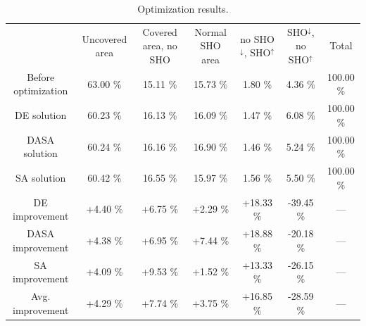 \begin{table}
\centering

\caption{Optimization results.\textit{\label{tab:optimization-results}}}


\begin{tabular}{ccccccc}
\toprule 
 & Uncovered area & Covered area, no SHO & Normal SHO area & no SHO$^{\downarrow}$, SHO$^{\uparrow}$ & SHO$^{\downarrow}$, no SHO$^{\uparrow}$ & Total\tabularnewline\addlinespace
\midrule
Before optimization & 63.00 \% & 15.11 \% & 15.73 \% & 1.80 \% & 4.36 \% & 100.00 \%\tabularnewline
\cmidrule{2-7} 
DE solution & 60.23 \% & 16.13 \% & 16.09 \% & 1.47 \% & 6.08 \% & 100.00 \%\tabularnewline
DASA solution & 60.24 \% & 16.16 \% & 16.90 \% & 1.46 \% & 5.24 \% & 100.00 \%\tabularnewline
SA solution & 60.42 \% & 16.55 \% & 15.97 \% & 1.56 \% & 5.50 \% & 100.00 \%\tabularnewline
\cmidrule{2-7} 
DE improvement & +4.40 \% & +6.75 \% & +2.29 \% & +18.33 \% & -39.45 \% & ---\tabularnewline
DASA improvement & +4.38 \% & +6.95 \% & +7.44 \% & +18.88 \% & -20.18 \% & ---\tabularnewline
SA improvement & +4.09 \% & +9.53 \% & +1.52 \% & +13.33 \% & -26.15 \% & ---\tabularnewline
\cmidrule{2-7} 
Avg. improvement & +4.29 \% & +7.74 \% & +3.75 \% & +16.85 \% & -28.59 \% & ---\tabularnewline
\bottomrule
\end{tabular}
\end{table}


